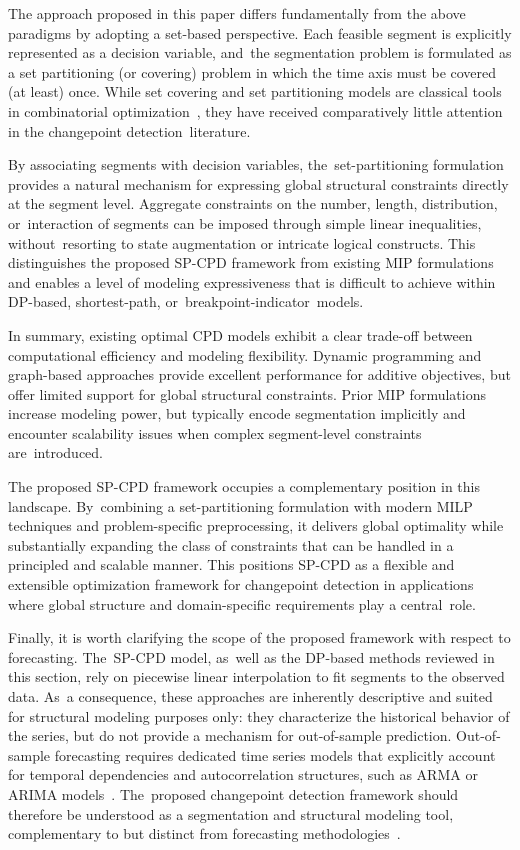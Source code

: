 \documentclass[mathematics,article,accept,pdftex,moreauthors]{Definitions/mdpi}
\begin{document}
The approach proposed in this paper differs fundamentally from the above paradigms by adopting a set-based perspective. Each feasible segment is explicitly represented as a decision variable, and~the segmentation problem is formulated as a set partitioning (or covering) problem in which the time axis must be covered (at least) once. While set covering and set partitioning models are classical tools in combinatorial optimization~\cite{B69,S03}, they have received comparatively little attention in the changepoint detection~literature.

By associating segments with decision variables, the~set-partitioning formulation provides a natural mechanism for expressing global structural constraints directly at the segment level. Aggregate constraints on the number, length, distribution, or~interaction of segments can be imposed through simple linear inequalities, without~resorting to state augmentation or intricate logical constructs. This distinguishes the proposed SP-CPD framework from existing MIP formulations and enables a level of modeling expressiveness that is difficult to achieve within DP-based, shortest-path, or~breakpoint-indicator~models.

In summary, existing optimal CPD models exhibit a clear trade-off between computational efficiency and modeling flexibility. Dynamic programming and graph-based approaches provide excellent performance for additive objectives, but offer limited support for global structural constraints. Prior MIP formulations increase modeling power, but typically encode segmentation implicitly and encounter scalability issues when complex segment-level constraints are~introduced.

The proposed SP-CPD framework occupies a complementary position in this landscape. By~combining a set-partitioning formulation with modern MILP techniques and problem-specific preprocessing, it delivers global optimality while substantially expanding the class of constraints that can be handled in a principled and scalable manner. This positions SP-CPD as a flexible and extensible optimization framework for changepoint detection in applications where global structure and domain-specific requirements play a central~role.

{Finally, it is worth clarifying the scope of the proposed framework with respect to forecasting. The~SP-CPD model, as~well as the DP-based methods reviewed in this section, rely on piecewise linear interpolation to fit segments to the observed data. As~a consequence, these approaches are inherently descriptive and suited for structural modeling purposes only: they characterize the historical behavior of the series, but do not provide a mechanism for out-of-sample prediction. Out-of-sample forecasting requires dedicated time series models that  explicitly account for temporal dependencies and autocorrelation structures, such as ARMA or ARIMA models~\cite{box2015,hyndman2018}. The~proposed changepoint detection framework should therefore be understood as a segmentation and structural modeling tool, complementary to but distinct from forecasting methodologies~\cite{lopez2021}.}
\end{document}

